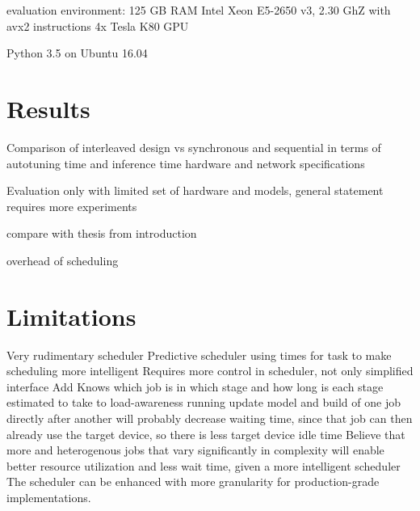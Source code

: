 evaluation environment:
125 GB RAM
Intel Xeon E5-2650 v3, 2.30 GhZ with avx2 instructions
4x Tesla K80 GPU

Python 3.5
on Ubuntu 16.04

\section{Results}
Comparison of interleaved design vs synchronous and sequential in terms of autotuning time and inference time
hardware and network specifications

Evaluation only with limited set of hardware and models, general statement requires more experiments

compare with thesis from introduction

overhead of scheduling

\section{Limitations}
Very rudimentary scheduler
Predictive scheduler using times for task to make scheduling more intelligent
Requires more control in scheduler, not only simplified interface
Add Knows which job is in which stage and how long is each stage estimated to take to load-awareness
running update model and build of one job directly after another will probably decrease waiting time, since that job can then already use the target device, so there is less target device idle time
Believe that more and heterogenous jobs that vary significantly in complexity will enable better resource utilization and less wait time, given a more intelligent scheduler
The scheduler can be enhanced with more granularity for production-grade implementations.